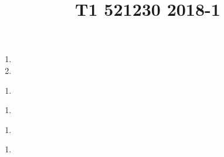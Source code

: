 \documentclass[legalpaper,11pt]{article}
\title{T1 521230 2018-1}
\begin{document}
\begin{enumerate}
\item {}  	\vfill
\item {}  	\vfill
\end{enumerate}			\vfill

\begin{enumerate}
\item {}  	\vfill
\end{enumerate}			\vfill

\begin{enumerate}
\item {} 	\vfill
\end{enumerate}			\vfill

\begin{enumerate}
\item {}  	\vfill
\end{enumerate}			\vfill

\begin{enumerate}
\item  {}  	\vfill
\end{enumerate} 		\vfill
\end{document}
